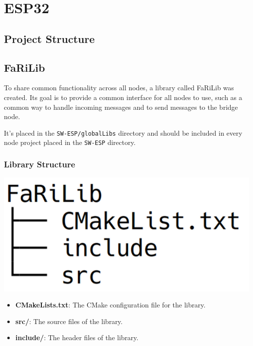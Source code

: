 \chapter{ESP32}

\section{Project Structure}

\section{FaRiLib}
To share common functionality across all nodes, a library called FaRiLib was
created. Its goal is to provide a common interface for all nodes to use, such as
a common way to handle incoming messages and to send messages to the bridge node. 
\par\vspace{0.5em}
It's placed in the \texttt{SW-ESP/globalLibs} directory and should be included in
every node project placed in the \texttt{SW-ESP} directory.
    \subsection{Library Structure}
        \begin{minipage}{0.48\textwidth}
            \includegraphics[width=0.8\linewidth]{assets/FaRiLibStructure.png}
            \label{fig:farilib_structure}
        \end{minipage}%
        \begin{minipage}{0.48\textwidth}
            \raggedright
            \begin{itemize}
                \item \textbf{CMakeLists.txt}: The CMake configuration file for the 
                library.
                \item \textbf{src/}: The source files of the library.
                \item \textbf{include/}: The header files of the library.
            \end{itemize}
        \end{minipage}
